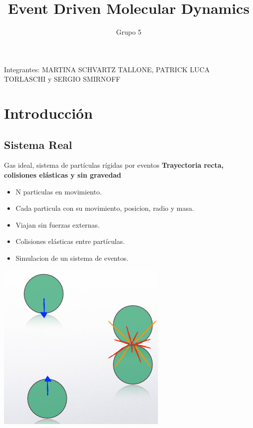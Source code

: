 \documentclass{beamer}
\title{Event Driven Molecular Dynamics}
\author{Grupo 5}
\institute{ITBA}
\date{} %
\begin{document}
\begin{frame}
  \titlepage
  \small Integrantes: MARTINA SCHVARTZ TALLONE, PATRICK LUCA TORLASCHI y SERGIO SMIRNOFF
\end{frame}

\section{Introducción}
\subsection{Sistema Real}
\begin{frame}{Gas ideal, sistema de partículas rígidas por eventos}
  \textbf{Trayectoria recta, colisiones elásticas y sin gravedad}
  \vspace{0.5cm}
  \begin{itemize}
    \item N particulas en movimiento.
    \item Cada particula con su movimiento, posicion, radio y masa.
    \item Viajan sin fuerzas externas.
    \item Colisiones elásticas entre partículas.
    \item Simulacion de un sistema de eventos.
  \end{itemize}
  \begin{center}
    \includegraphics[width=0.3\linewidth]{photoMaterial/eventos_sistema_real.png}
  \end{center}
\end{frame}
\end{document}
